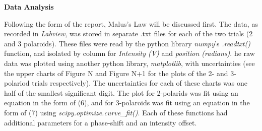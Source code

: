 \documentclass[11pt]{article}
\begin{document}
\begin{multicols}{2}


    

    \vspace{10pt}

     \selectfont \textbf{Data Analysis}
    
     \selectfont 
    
    Following the form of the report, Malus's Law will be discussed first. The data, as recorded in \textit{Labview}, was stored in separate .txt files for each of the two trials (2 and 3 polaroids). 
    These files were read by the python library \textit{numpy}'s \textit{.readtxt()} function, and isolated by column for \textit{Intensity (V)} and \textit{position (radians)}.
    he raw data was plotted using another python library, \textit{matplotlib}, with uncertainties (see the upper charts of Figure N and Figure N+1 for the plots of the 2- and 3-polariod trials respectively).
    The uncertainties for each of these charts was one half of the smallest significant digit.
    The plot for 2-polarids was fit using an equation in the form of (6), and for 3-polaroids was fit using an equation in the form of (7) using \textit{scipy.optimize.curve\_fit()}. 
    Each of these functions had additional parameters for a phase-shift and an intensity offset.  


\end{multicols}
\end{document}
